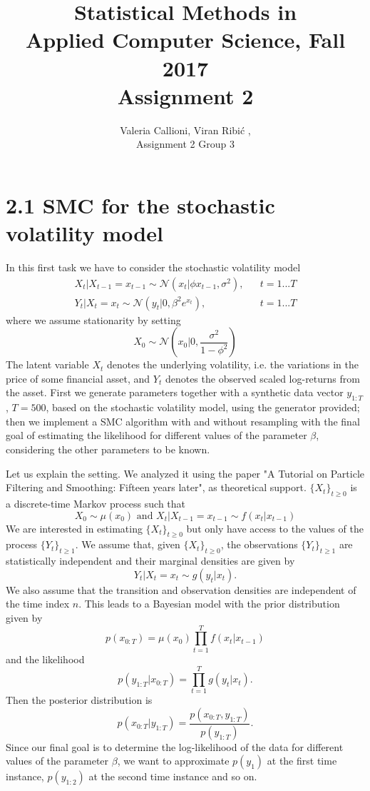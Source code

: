 \documentclass[]{article}
\title{Statistical Methods in \\ Applied Computer Science, Fall 2017 \\ Assignment 2}
\author{Valeria Callioni, Viran Ribi\'c , \\ Assignment 2 Group 3}
\begin{document}
\maketitle

\newpage

\section*{2.1 SMC for the stochastic volatility model}
In this first task we have to consider the stochastic volatility model
\begin{align*}
	X_t|X_{t-1} = x_{t-1} \sim \mathcal{N}(x_t | \phi x_{t-1},\sigma^2), && t=1...T 
	\\
	Y_t|X_t = x_t \sim \mathcal{N}(y_t | 0, \beta^2e^{x_t}), && t=1...T 
\end{align*}
where we assume stationarity by setting 
$$
X_0 \sim \mathcal{N}(x_0 | 0, \frac{\sigma^2}{1-\phi^2})
$$
The latent variable $X_t$ denotes the underlying volatility, i.e. the variations in the price of some ﬁnancial asset, and $Y_t$ denotes the observed scaled log-returns from the asset. 
First we generate parameters together with a synthetic data vector $y_{1:T}$, $T = 500$, based on the stochastic volatility model, using the generator provided; then we implement a SMC algorithm with and without resampling with the final goal of estimating the likelihood for different values of the parameter $\beta$, considering the other parameters to be known. 

Let us explain the setting. We analyzed it using the paper "A Tutorial on Particle Filtering and Smoothing: Fifteen years later", as theoretical support. $\{X_t\}_{t\geq0}$ is a discrete-time Markov process such that 
$$
X_0 \sim \mu(x_0) \text{ and } X_t|X_{t-1} = x_{t-1} \sim f(x_t|x_{t-1})
$$
We are interested in estimating $\{X_t\}_{t\geq0}$ but only have access to the values of the process $\{Y_t\}_{t\geq1}$. We assume that, given $\{X_t\}_{t\geq0}$, the observations $\{Y_t\}_{t\geq1}$ are statistically independent and their marginal densities are given by
$$
Y_t|X_t = x_t \sim g(y_t|x_t).
$$
We also assume that the transition and observation densities are independent of the time index $n$. This leads to a Bayesian model with the prior distribution given by 
$$
p(x_{0:T}) = \mu(x_0)\prod_{t=1}^{T}f(x_t|x_{t-1})
$$
and the likelihood
$$
p(y_{1:T}|x_{0:T}) = \prod_{t=1}^{T}g(y_t|x_t).
$$
Then the posterior distribution is
$$
p(x_{0:T}|y_{1:T}) = \frac{p(x_{0:T},y_{1:T})}{p(y_{1:T})}.
$$
Since our final goal is to determine the log-likelihood of the data for different values of the parameter $\beta$, we want to approximate $p(y_1)$ at the first time instance, $p(y_{1:2})$ at the second time instance and so on.
\end{document}
